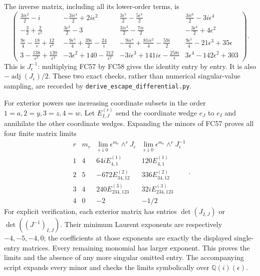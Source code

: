 The inverse matrix, including all its lower-order terms, is
\[
\renewcommand{\arraystretch}{1.25}
\begin{pmatrix}
 \frac{3i\epsilon^2}{2}-i&-\frac{3i\epsilon^4}{2}+2i\epsilon^2&
 \frac{3\epsilon^5}{2}-\frac{5\epsilon^3}{2}&\frac{3i\epsilon^6}{2}-3i\epsilon^4\\
 -\frac32+\frac2{\epsilon^2}&\frac{3\epsilon^2}{2}-3&
 \frac{3i\epsilon^3}{2}-\frac{7i\epsilon}{2}&-\frac{3\epsilon^4}{2}+4\epsilon^2\\
 \frac{9\epsilon}{4}-\frac{18}{\epsilon}+\frac{12}{\epsilon^3}&
 -\frac{9\epsilon^3}{4}+\frac{39\epsilon}{2}-\frac{24}{\epsilon}&
 -\frac{9i\epsilon^4}{4}+\frac{81i\epsilon^2}{4}-\frac{59i}{2}&
 \frac{9\epsilon^5}{4}-21\epsilon^3+35\epsilon\\
 3-\frac{138}{\epsilon^2}+\frac{120}{\epsilon^4}&
 -3\epsilon^2+140-\frac{212}{\epsilon^2}&
 -3i\epsilon^3+141i\epsilon-\frac{258i}{\epsilon}&
 3\epsilon^4-142\epsilon^2+303
\end{pmatrix}.
\tag{FC58}
\]
This is $J_\epsilon^{-1}$: multiplying FC57 by FC58 gives the identity
entry by entry. It is also $-\operatorname{adj}(J_\epsilon)/2$.
These two exact checks, rather than numerical singular-value sampling,
are recorded by \texttt{derive\_escape\_differential.py}.

For exterior powers use increasing coordinate subsets in the order
$1=a,2=y,3=z,4=w$. Let $E^{(r)}_{I,J}$ send the coordinate wedge
$e_J$ to $e_I$ and annihilate the other coordinate wedges. Expanding
the minors of FC57 proves all four finite matrix limits
\[
\begin{array}{c|c|c|c}
 r&m_r&\displaystyle\lim_{\epsilon\downarrow0}
       \epsilon^{m_r}\wedge^rJ_\epsilon&
 \displaystyle\lim_{\epsilon\downarrow0}
       \epsilon^{m_r}\wedge^rJ_\epsilon^{-1}\\\hline
 1&4&64iE^{(1)}_{4,1}&120E^{(1)}_{4,1}\\
 2&5&-672E^{(2)}_{34,12}&336E^{(2)}_{34,12}\\
 3&4&240E^{(3)}_{234,123}&32iE^{(3)}_{234,123}\\
 4&0&-2&-1/2
\end{array}.
\tag{FC59}
\]
For explicit verification, each exterior matrix has entries
$\det(J_{I,J})$ or $\det((J^{-1})_{I,J})$. Their minimum Laurent
exponents are respectively $-4,-5,-4,0$; the coefficients at those
exponents are exactly the displayed single-entry matrices. Every
remaining monomial has larger exponent. This proves the limits and
the absence of any more singular omitted entry. The accompanying
script expands every minor and checks the limits symbolically over
$\mathbb Q(i)(\epsilon)$.

